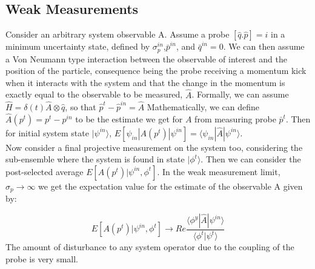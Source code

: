 \documentclass{article}
\numberwithin{equation}{section}
\begin{document}
\begin{Abstract}
\subsection{Weak Measurements}

Consider an arbitrary system observable A. Assume a probe $[\hat{q}.\hat{p}] = i$
in a minimum uncertainty state, defined by $\sigma^{in}_p$,$\bar{p}^{in}$, and 
$\bar{q}^{in}=0$. We can then assume a Von Neumann type interaction between the 
observable of interest and the position of the particle, consequence being the 
probe receiving a momentum kick when it interacts with the system and that the 
change in the momentum is exactly equal to the observable to be measured, $\hat{A}$.
Formally, we can assume $\hat{H} = \delta(t)\hat{A}\otimes \hat{q}$, so that 
$\hat{p}^t - \hat{p}^{in} = \hat{A}$ 
Mathematically, we can define $\hat{A}(p^t) = p^t-p^{in}$ to be the estimate we 
get for $A$ from measuring probe $\bar{p}^t$. Then for initial system state $|\psi^{in}\rangle$, 
$E[\psi_{in}|A(p^t)|\psi^{in}]=\langle\psi_{in}|\hat{A}|\psi^{in}\rangle$.\\
Now consider a final projective measurement on the system too, considering the 
sub-ensemble where the system is found in state $|\phi^t\rangle$. Then we can consider 
the post-selected average $E[A(p^t)|\psi^{in},\phi^{t}]$.
In the weak measurement limit, $\sigma_p\rightarrow\infty$ we get the expectation value for the estimate 
of the observable A given by: 

$$E[A(p^t)|\psi^{in},\phi^t]\rightarrow Re\frac{\langle\phi^y|\hat{A}|\psi^{in}\rangle}{\langle\phi^t|\psi^t\rangle}$$
The amount of disturbance to any system operator due to the coupling of the probe is very small. 




\end{Abstract}
\end{document}
